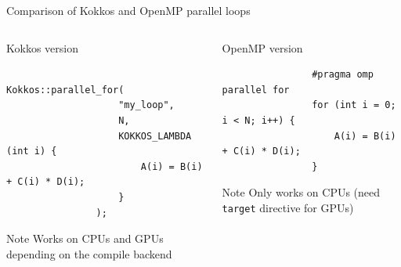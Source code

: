 \documentclass[aspectratio=169]{beamer}
\begin{document}

\begin{frame}[fragile]{Comparison of Kokkos and OpenMP parallel loops}
    \begin{columns}
        \begin{column}{0.5\linewidth}
            Kokkos version

            \begin{verbatim}
                Kokkos::parallel_for(
                    "my_loop",
                    N,
                    KOKKOS_LAMBDA (int i) {
                        A(i) = B(i) + C(i) * D(i);
                    }
                );
            \end{verbatim}
            \begin{block}{Note}
                Works on CPUs and GPUs depending on the compile backend
            \end{block}
        \end{column}
        \begin{column}{0.5\linewidth}
            OpenMP version

            \begin{verbatim}
                #pragma omp parallel for
                for (int i = 0; i < N; i++) {
                    A(i) = B(i) + C(i) * D(i);
                }
            \end{verbatim}
            \begin{block}{Note}
                Only works on CPUs (need \texttt{target} directive for GPUs)
            \end{block}
        \end{column}
    \end{columns}
\end{frame}

\end{document}
